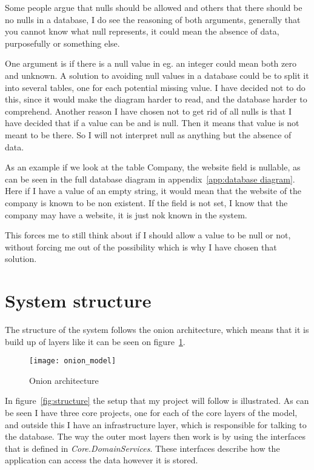 Some people argue that nulls should be allowed and others that there should be no nulls in a database\cite{stackexchange:db:nullfields}, I do see the reasoning of both arguments, generally that you cannot know what null represents, it could mean the absence of data, purposefully or something else.

One argument is if there is a null value in eg. an integer could mean both zero
and unknown. A solution to avoiding null values in a database could be to split
it into several tables, one for each potential missing value. I have decided not
to do this, since it would make the diagram harder to read, and the database
harder to comprehend. Another reason I have chosen not to get rid of all nulls
is that I have decided that if a value can be and is null. Then it means that
value is not meant to be there. So I will not interpret null as anything but the
absence of data.

As an example if we look at the table Company, the website field is nullable, as
can be seen in the full database diagram in appendix~\ref{app:database diagram}.
Here if I have a value of an empty string, it would mean that the website of
the company is known to be non existent. If the field is not set, I know that
the company may have a website, it is just nok known in the system.

This forces me to still think about if I should allow a value to be null or not, without forcing me out of the possibility which is why I have chosen that solution.

\section{System structure}
\label{sec:System structure}
The structure of the system follows the onion architecture\cite{onion_architecture}, which means that it is build up of layers like it can be seen on figure~\ref{fig:Onion architecture}.

\begin{figure}[h]
  \centering
  \texttt{[image: onion\_model]}
  \caption[Onion architecture]{Onion architecture\protect\footnotemark}
  \label{fig:Onion architecture}
\end{figure}

In figure~\ref{fig:structure} the setup that my project will follow is illustrated. As can be seen I have three core projects, one for each of the core layers of the model, and outside this I have an infrastructure layer, which is responsible for talking to the database. The way the outer most layers then work is by using the interfaces that is defined in \textit{Core.DomainServices}. These interfaces describe how the application can access the data however it is stored.

